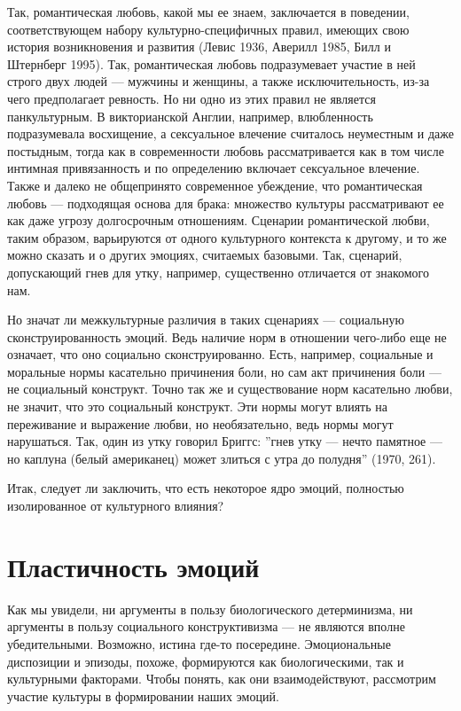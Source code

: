 \documentclass[11pt]{book}
\begin{document}
Так, романтическая любовь, какой мы ее знаем, заключается в поведении, соответствующем набору культурно-специфичных правил, имеющих свою история возникновения и развития (Левис 1936, Аверилл 1985, Билл и Штернберг 1995). Так, романтическая любовь подразумевает участие в ней строго двух людей --- мужчины и женщины, а также исключительность, из-за чего предполагает ревность. Но ни одно из этих правил не является панкультурным. В викторианской Англии, например, влюбленность подразумевала восхищение, а сексуальное влечение считалось неуместным и даже постыдным, тогда как в современности любовь рассматривается как в том числе интимная привязанность и по определению включает сексуальное влечение. Также и далеко не общепринято современное убеждение, что романтическая любовь --- подходящая основа для брака: множество культуры рассматривают ее как даже угрозу долгосрочным отношениям. Сценарии романтической любви, таким образом, варьируются от одного культурного контекста к другому, и то же можно сказать и о других эмоциях, считаемых базовыми. Так, сценарий, допускающий гнев для утку, например, существенно отличается от знакомого нам.

Но значат ли межкультурные различия в таких сценариях --- социальную сконструированность эмоций. Ведь наличие норм в отношении чего-либо еще не означает, что оно социально сконструированно. Есть, например, социальные и моральные нормы касательно причинения боли, но сам акт причинения боли --- не социальный конструкт. Точно так же и существование норм касательно любви, не значит, что это социальный конструкт. Эти нормы могут влиять на переживание и выражение любви, но необязательно, ведь нормы могут нарушаться. Так, один из утку говорил Бриггс: ''гнев утку --- нечто памятное --- но каплуна (белый американец) может злиться с утра до полудня'' (1970, 261).

Итак, следует ли заключить, что есть некоторое ядро эмоций, полностью изолированное от культурного влияния?

\section{Пластичность эмоций}

Как мы увидели, ни аргументы в пользу биологического детерминизма, ни аргументы в пользу социального конструктивизма --- не являются вполне убедительными. Возможно, истина где-то посередине. Эмоциональные диспозиции и эпизоды, похоже, формируются как биологическими, так и культурными факторами. Чтобы понять, как они взаимодействуют, рассмотрим участие культуры в формировании наших эмоций.
\end{document}
